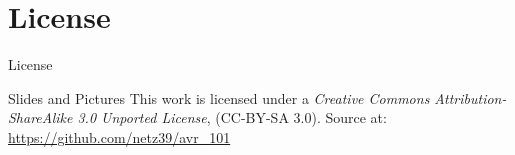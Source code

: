 \documentclass{beamer}
\begin{document}
\appendix

\section{License}

\begin{frame}{License}
    \begin{block}{Slides and Pictures}
        This work is licensed under a \emph{Creative Commons
        Attribution-ShareAlike 3.0 Unported License}, (CC-BY-SA 3.0).
        Source at: \url{https://github.com/netz39/avr_101}
    \end{block}
\end{frame}
\end{document}
